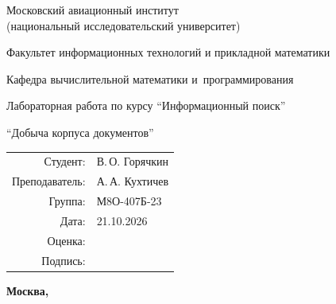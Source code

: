 \begin{titlepage}
\begin{center}
\bfseries

{\Large Московский авиационный институт\\ (национальный исследовательский университет)

}

\vspace{48pt}

{\large Факультет информационных технологий и прикладной математики
}

\vspace{36pt}

{\large Кафедра вычислительной математики и~программирования

}

\vspace{48pt}

Лабораторная работа  по курсу \enquote{Информационный поиск}

\vspace{12pt}

{\large \enquote{Добыча корпуса документов}}

\end{center}

\vspace{72pt}

\begin{flushright}
\begin{tabular}{rl}
Студент: & В.\,О. Горячкин \\
Преподаватель: & А.\,А. Кухтичев \\
Группа: & М8О-407Б-23 \\
Дата: & 21.10.2026 \\
Оценка: & \\
Подпись: & \\
\end{tabular}
\end{flushright}

\vfill

\begin{center}
\bfseries
Москва, \the\year
\end{center}
\end{titlepage}

\pagebreak
